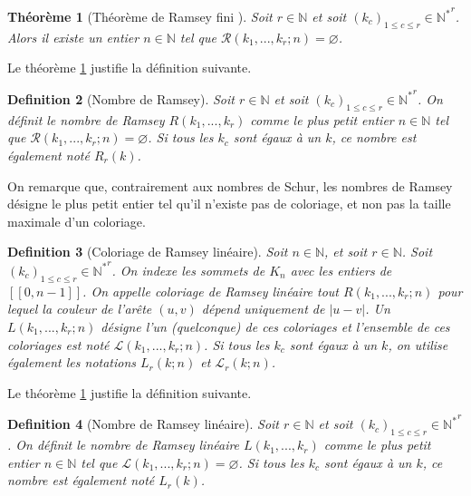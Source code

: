 \documentclass{article}
\newtheorem{definition}{Definition}[section]
\newtheorem{theorem}[definition]{Théorème}
\begin{document}
\begin{theorem}[Théorème de Ramsey fini \cite{Ramsey}]
\label{thm:ram}
Soit \(r \in \mathbb{N}\) et soit \((k_c)_{1 \leqslant c \leqslant r} \in {\mathbb{N}^*}^r\). Alors il existe un entier \(n \in \mathbb{N}\) tel que \(\mathcal{R}(k_1, ..., k_r ; n) = \varnothing\).
\end{theorem}

Le théorème \ref{thm:ram} justifie la définition suivante.

\begin{definition}[Nombre de Ramsey]
Soit \(r \in \mathbb{N}\) et soit \((k_c)_{1 \leqslant c \leqslant r} \in {\mathbb{N}^*}^r\). On définit le nombre de Ramsey \(R(k_1, ..., k_r)\) comme le plus petit entier \(n \in \mathbb{N}\) tel que \(\mathcal{R}(k_1, ..., k_r ; n) = \varnothing\). Si tous les \(k_c\) sont égaux à un \(k\), ce nombre est également noté \(R_r(k)\).
\end{definition}

On remarque que, contrairement aux nombres de Schur, les nombres de Ramsey désigne le plus petit entier tel qu'il n'existe pas de coloriage, et non pas la taille maximale d'un coloriage.

\begin{definition}[Coloriage de Ramsey linéaire]
Soit \(n \in \mathbb{N}\), et soit \(r \in \mathbb{N}\). Soit \((k_c)_{1 \leqslant c \leqslant r} \in {\mathbb{N}^*}^r\). On indexe les sommets de \(K_n\) avec les entiers de \([\![0, n - 1]\!]\). On appelle coloriage de Ramsey linéaire tout \(R(k_1, ..., k_r ; n)\) pour lequel la couleur de l'arête \((u, v)\) dépend uniquement de \(|u - v|\). Un \(L(k_1, ..., k_r ; n)\) désigne l'un (quelconque) de ces coloriages et l'ensemble de ces coloriages est noté \(\mathcal{L}(k_1, ..., k_r ; n)\). Si tous les \(k_c\) sont égaux à un \(k\), on utilise également les notations \(L_r(k; n)\) et \(\mathcal{L}_r(k; n)\).
\end{definition}

Le théorème \ref{thm:ram} justifie la définition suivante.

\begin{definition}[Nombre de Ramsey linéaire]
Soit \(r \in \mathbb{N}\) et soit \((k_c)_{1 \leqslant c \leqslant r} \in {\mathbb{N}^*}^r\). On définit le nombre de Ramsey linéaire \(L(k_1, ..., k_r)\) comme le plus petit entier \(n \in \mathbb{N}\) tel que \(\mathcal{L}(k_1, ..., k_r ; n) = \varnothing\). Si tous les \(k_c\) sont égaux à un \(k\), ce nombre est également noté \(L_r(k)\).
\end{definition}
\end{document}
